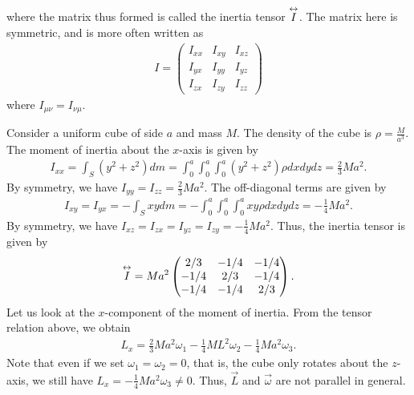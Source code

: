 where the matrix thus formed is called the inertia tensor $\overset{\leftrightarrow}{I}$. The matrix here is symmetric, and is more often written as
\begin{align}
    I = \begin{pmatrix}
        I_{xx} & I_{xy} & I_{xz} \\
        I_{yx} & I_{yy} & I_{yz} \\
        I_{zx} & I_{zy} & I_{zz}
    \end{pmatrix}
\end{align}
where $I_{\mu \nu} = I_{\nu \mu}$.

\begin{example}
    Consider a uniform cube of side $a$ and mass $M$. The density of the cube is $\rho = \frac{M}{a^{3}}$. The moment of inertia about the $x$-axis is given by
    \begin{align}
        I_{xx} = \int_{S} (y^{2}+z^{2}) dm = \int_{0}^{a} \int_{0}^{a} \int_{0}^{a} (y^{2}+z^{2}) \rho dx dy dz = \frac{2}{3} Ma^{2}.
    \end{align}
    By symmetry, we have $I_{yy} = I_{zz} = \frac{2}{3} Ma^{2}$. The off-diagonal terms are given by
    \begin{align}
        I_{xy} = I_{yx} = -\int_{S} xy dm = -\int_{0}^{a} \int_{0}^{a} \int_{0}^{a} xy \rho dx dy dz = -\frac{1}{4}Ma^{2}.
    \end{align}
    By symmetry, we have $I_{xz} = I_{zx} = I_{yz} = I_{zy} = -\frac{1}{4}Ma^{2}$. Thus, the inertia tensor is given by
    \begin{align}
        \overset{\leftrightarrow}{I} = Ma^{2} \begin{pmatrix}
            2/3 & -1/4 & -1/4 \\
            -1/4 & 2/3 & -1/4 \\
            -1/4 & -1/4 & 2/3
        \end{pmatrix}.
    \end{align}
    Let us look at the $x$-component of the moment of inertia. From the tensor relation above, we obtain
    \begin{align}
        L_{x} = \frac{2}{3}Ma^{2}\omega_{1} - \frac{1}{4} ML^{2} \omega_{2} - \frac{1}{4} Ma^{2} \omega_{3}.
    \end{align}
    Note that even if we set $\omega_{1} = \omega_{2} = 0$, that is, the cube only rotates about the $z$-axis, we still have $L_{x} = -\frac{1}{4} Ma^{2} \omega_{3} \neq 0$. Thus, $\vec{L}$ and $\vec{\omega}$ are not parallel in general.
\end{example}

